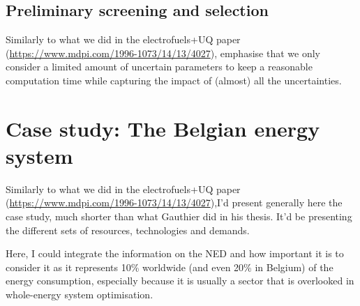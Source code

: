 \subsection{Preliminary screening and selection}
\label{subsec:screening}
Similarly to what we did in the electrofuels+UQ paper (\url{https://www.mdpi.com/1996-1073/14/13/4027}), emphasise that we only consider a limited amount of uncertain parameters to keep a reasonable computation time while capturing the impact of (almost) all the uncertainties.

\section{Case study: The Belgian energy system}
\label{sec:case_study}
Similarly to what we did in the electrofuels+UQ paper (\url{https://www.mdpi.com/1996-1073/14/13/4027}),I'd present generally here the case study, much shorter than what Gauthier did in his thesis. It'd be presenting the different sets of resources, technologies and demands.

Here, I could integrate the information on the NED and how important it is to consider it as it represents 10\% worldwide (and even 20\% in Belgium) of the energy consumption, especially because it is usually a sector that is overlooked in whole-energy system optimisation.









